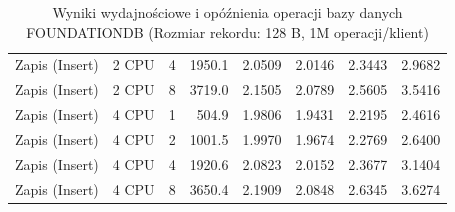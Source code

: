 \begin{table}[ht]
{\begin{tabular}{llcrrrrr}
Zapis (Insert) & 2 CPU & 4 & 1950.1 & 2.0509 & 2.0146 & 2.3443 & 2.9682 \\
Zapis (Insert) & 2 CPU & 8 & 3719.0 & 2.1505 & 2.0789 & 2.5605 & 3.5416 \\
Zapis (Insert) & 4 CPU & 1 & 504.9 & 1.9806 & 1.9431 & 2.2195 & 2.4616 \\
Zapis (Insert) & 4 CPU & 2 & 1001.5 & 1.9970 & 1.9674 & 2.2769 & 2.6400 \\
Zapis (Insert) & 4 CPU & 4 & 1920.6 & 2.0823 & 2.0152 & 2.3677 & 3.1404 \\
Zapis (Insert) & 4 CPU & 8 & 3650.4 & 2.1909 & 2.0848 & 2.6345 & 3.6274 \\
\bottomrule
\end{tabular}%
}
\caption{Wyniki wydajnościowe i opóźnienia operacji bazy danych FOUNDATIONDB (Rozmiar rekordu: 128 B, 1M operacji/klient)}
\label{tab:latency_foundationdb_small_1000000}
\end{table}
